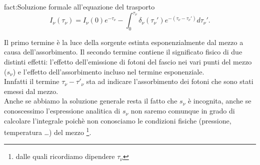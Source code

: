 \begin{fact}{fact:Soluzione formale all'equazione del trasporto}
	\[
	I_{\nu}\left( \tau_{\nu} \right) = I_{\nu}\left( 0 \right)e^{-\tau_{\nu}} - \int_{0}^{\tau_{\nu}} \delta_{\nu}\left( \tau_{\nu}' \right) e^{-(\tau_{\nu}-\tau_{\nu}')}d \tau_{\nu}'
.\] 
\end{fact}
Il primo termine è la luce della sorgente estinta esponenzialmente dal mezzo a causa dell'assorbimento. Il secondo termine contiene il significato fisico di due distinti effetti: l'effetto dell'emissione di fotoni del fascio nei vari punti del mezzo ($s_{\nu} $) e l'effetto dell'assorbimento incluso nel termine esponenziale.\\
Innfatti il termine $\tau _{\nu} -\tau '_{\nu} $ sta ad indicare l'assorbimento dei fotoni che sono stati emessi dal mezzo. \\
Anche se abbiamo la soluzione generale resta il fatto che $s_{\nu} $ è incognita, anche se conoscessimo l'espressione analitica di $s_{\nu} $ non saremo comunque in grado di calcolare l'integrale poichè non conosciamo le condizioni fisiche (pressione, temperatura \ldots) del mezzo \footnote{dalle quali ricordiamo dipendere $\tau _{\nu} $}.
